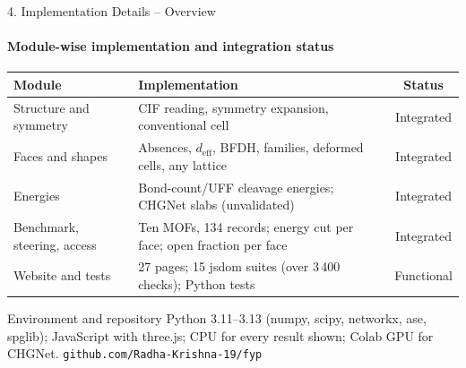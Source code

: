 \documentclass[aspectratio=169, 11pt]{beamer}
\begin{document}
\begin{frame}{4. Implementation Details -- Overview}
    \framesubtitle{Module-wise implementation and integration status}
    \begin{table}
        \centering
        \scriptsize
        \renewcommand{\arraystretch}{1.2}
        \begin{tabular}{p{3.2cm} p{8.3cm} c}
            \toprule
            \textbf{Module} & \textbf{Implementation} & \textbf{Status} \\
            \midrule
            Structure and symmetry & CIF reading, symmetry expansion, conventional cell & Integrated \\
            Faces and shapes & Absences, $d_\text{eff}$, BFDH, families, deformed cells, any lattice & Integrated \\
            Energies & Bond-count/UFF cleavage energies; CHGNet slabs (unvalidated) & Integrated \\
            Benchmark, steering, access & Ten MOFs, 134 records; energy cut per face; open fraction per face & Integrated \\
            Website and tests & 27 pages; 15 jsdom suites (over 3\,400 checks); Python tests & Functional \\
            \bottomrule
        \end{tabular}
    \end{table}
    \begin{block}{Environment and repository}
        \footnotesize Python 3.11--3.13 (numpy, scipy, networkx, ase, spglib); JavaScript with three.js; CPU for every result shown; Colab GPU for CHGNet. \texttt{github.com/Radha-Krishna-19/fyp}
    \end{block}
\end{frame}
\end{document}

